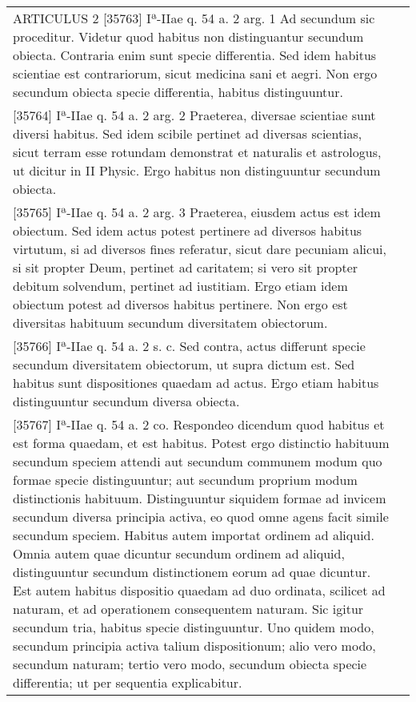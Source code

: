 \documentclass[10pt]{jsarticle} %
\begin{document}
\begin{longtable}{p{21em}p{21em}}


ARTICULUS 2
[35763] Iª-IIae q. 54 a. 2 arg. 1
Ad secundum sic proceditur. Videtur quod habitus non distinguantur secundum obiecta. Contraria enim sunt specie differentia. Sed idem habitus scientiae est contrariorum, sicut medicina sani et aegri. Non ergo secundum obiecta specie differentia, habitus distinguuntur.

&

\\


[35764] Iª-IIae q. 54 a. 2 arg. 2
Praeterea, diversae scientiae sunt diversi habitus. Sed idem scibile pertinet ad diversas scientias, sicut terram esse rotundam demonstrat et naturalis et astrologus, ut dicitur in II Physic. Ergo habitus non distinguuntur secundum obiecta.

&

\\


[35765] Iª-IIae q. 54 a. 2 arg. 3
Praeterea, eiusdem actus est idem obiectum. Sed idem actus potest pertinere ad diversos habitus virtutum, si ad diversos fines referatur, sicut dare pecuniam alicui, si sit propter Deum, pertinet ad caritatem; si vero sit propter debitum solvendum, pertinet ad iustitiam. Ergo etiam idem obiectum potest ad diversos habitus pertinere. Non ergo est diversitas habituum secundum diversitatem obiectorum.

&

\\


[35766] Iª-IIae q. 54 a. 2 s. c.
Sed contra, actus differunt specie secundum diversitatem obiectorum, ut supra dictum est. Sed habitus sunt dispositiones quaedam ad actus. Ergo etiam habitus distinguuntur secundum diversa obiecta.

&

\\


[35767] Iª-IIae q. 54 a. 2 co.
Respondeo dicendum quod habitus et est forma quaedam, et est habitus. Potest ergo distinctio habituum secundum speciem attendi aut secundum communem modum quo formae specie distinguuntur; aut secundum proprium modum distinctionis habituum. Distinguuntur siquidem formae ad invicem secundum diversa principia activa, eo quod omne agens facit simile secundum speciem. Habitus autem importat ordinem ad aliquid. Omnia autem quae dicuntur secundum ordinem ad aliquid, distinguuntur secundum distinctionem eorum ad quae dicuntur. Est autem habitus dispositio quaedam ad duo ordinata, scilicet ad naturam, et ad operationem consequentem naturam. Sic igitur secundum tria, habitus specie distinguuntur. Uno quidem modo, secundum principia activa talium dispositionum; alio vero modo, secundum naturam; tertio vero modo, secundum obiecta specie differentia; ut per sequentia explicabitur.


\end{longtable}
\end{document}
